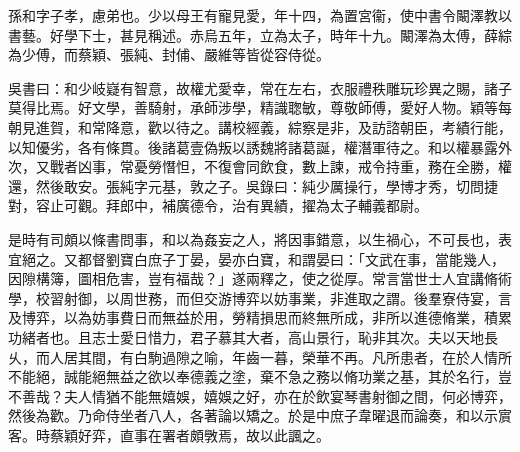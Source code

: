
\begin{pinyinscope}
孫和字子孝，慮弟也。少以母王有寵見愛，年十四，為置宮衞，使中書令闞澤教以書藝。好學下士，甚見稱述。赤烏五年，立為太子，時年十九。闞澤為太傅，薛綜為少傅，而蔡穎、張純、封俌、嚴維等皆從容侍從。

吳書曰：和少岐嶷有智意，故權尤愛幸，常在左右，衣服禮秩雕玩珍異之賜，諸子莫得比焉。好文學，善騎射，承師涉學，精識聦敏，尊敬師傅，愛好人物。穎等每朝見進賀，和常降意，歡以待之。講校經義，綜察是非，及訪諮朝臣，考績行能，以知優劣，各有條貫。後諸葛壹偽叛以誘魏將諸葛誕，權潛軍待之。和以權暴露外次，又戰者凶事，常憂勞憯怛，不復會同飲食，數上諫，戒令持重，務在全勝，權還，然後敢安。張純字元基，敦之子。吳錄曰：純少厲操行，學博才秀，切問捷對，容止可觀。拜郎中，補廣德令，治有異績，擢為太子輔義都尉。

是時有司頗以條書問事，和以為姦妄之人，將因事錯意，以生禍心，不可長也，表宜絕之。又都督劉寶白庶子丁晏，晏亦白寶，和謂晏曰：「文武在事，當能幾人，因隙構簿，圖相危害，豈有福哉？」遂兩釋之，使之從厚。常言當世士人宜講脩術學，校習射御，以周世務，而但交游博弈以妨事業，非進取之謂。後羣寮侍宴，言及博弈，以為妨事費日而無益於用，勞精損思而終無所成，非所以進德脩業，積累功緒者也。且志士愛日惜力，君子慕其大者，高山景行，恥非其次。夫以天地長乆，而人居其間，有白駒過隙之喻，年齒一暮，榮華不再。凡所患者，在於人情所不能絕，誠能絕無益之欲以奉德義之塗，棄不急之務以脩功業之基，其於名行，豈不善哉？夫人情猶不能無嬉娛，嬉娛之好，亦在於飲宴琴書射御之間，何必博弈，然後為歡。乃命侍坐者八人，各著論以矯之。於是中庶子韋曜退而論奏，和以示賔客。時蔡穎好弈，直事在署者頗斆焉，故以此諷之。


\end{pinyinscope}
